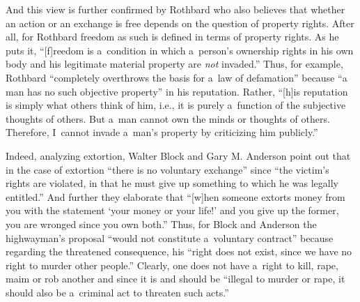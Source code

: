 And this view is further confirmed by Rothbard who also believes that whether an action or an exchange is free depends on the question of property rights. After all, for Rothbard freedom as such is defined in terms of property rights. As he 
\parencite*[][p.50]{} %
 puts it, ``[f]reedom is a~condition in which a~person's ownership rights in his own body and his legitimate material property are \textit{not} invaded.'' Thus, for example, Rothbard 
\parencite*[][pp.182–183]{rothbard_man_2009} %
 ``completely overthrows the basis for a~law of defamation'' because ``a man has no such objective property'' in his reputation. Rather, ``[h]is reputation is simply what others think of him, i.e., it is purely a~function of the subjective thoughts of others. But a~man cannot own the minds or thoughts of others. Therefore, I~cannot invade a~man's property by criticizing him publicly.''



Indeed, analyzing extortion, Walter Block and Gary M. Anderson 
\parencite*[][p.546]{} %
 point out that in the case of extortion ``there is no voluntary exchange'' since ``the victim's rights are violated, in that he must give up something to which he was legally entitled.'' And further they 
\parencite*[][p.546]{} %
 elaborate that ``[w]hen someone extorts money from you with the statement ‘your money or your life!' and you give up the former, you are wronged since you own both.'' Thus, for Block and Anderson 
\parencite*[][p.545]{block_blackmail_2000} %
 the highwayman's proposal ``would not constitute a~voluntary contract'' because regarding the threatened consequence, his ``right does not exist, since we have no right to murder other people.'' Clearly, one does not have a~right to kill, rape, maim or rob another and since it is and should be ``illegal to murder or rape, it should also be a~criminal act to threaten such acts.'' 
\parencite[][p.543]{block_blackmail_2000}%




